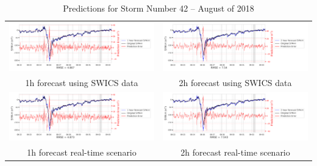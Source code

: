 \documentclass[draft,sw]{agutexSI2019}
\begin{document}
\begin{table}
\centering
\begin{tabular}{cc}
\includegraphics[width=0.49\linewidth]{paper_plots_shade/1h_swics/1h_swics_storm_42.png}
&
\includegraphics[width=0.49\linewidth]{paper_plots_shade/2h_swics/2h_swics_storm_42.png}
\\
1h forecast using SWICS data & 2h forecast using SWICS data
\vspace*{12pt}
\\
\includegraphics[width=0.49\linewidth]{paper_plots_shade/1h_rt/1h_rt_storm_42.png}
&
\includegraphics[width=0.49\linewidth]{paper_plots_shade/2h_rt/2h_rt_storm_42.png}
\\
1h forecast real-time scenario & 2h forecast real-time scenario 
\vspace*{12pt}
\\
\end{tabular}
\caption{Predictions for Storm Number 42 -- August of 2018}
\label{storm-42}
\end{table}
\end{document}
